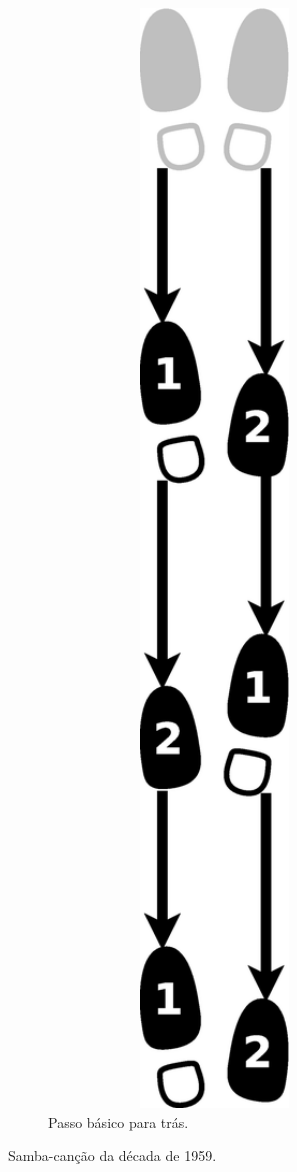 \begin{figure}[h]
    \begin{subfigure}[b]{0.7\textwidth}
        \centering
	\includegraphics[angle=270,width=0.97\textwidth]{chapters/cap-historia-sambagafieira/samba-cancao-basico-tras.eps}
        \caption{Passo básico para trás.}
        \label{fig:samba-cancao-basico-tras}
    \end{subfigure}
    \caption{Samba-canção da década de 1959.}\label{fig:samba-cancao-basico}
\end{figure}

